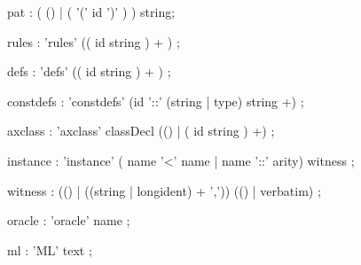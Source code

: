 \begin{rail}
pat : ( () | ( '(' id ')' ) ) string;

rules : 'rules' (( id string ) + )
      ;

defs : 'defs' (( id string ) + )
     ;

constdefs : 'constdefs' (id '::' (string | type) string +)
          ;

axclass : 'axclass' classDecl (() | ( id string ) +)
        ;

instance : 'instance' ( name '<' name | name '::' arity) witness
         ;

witness : (() | ((string | longident) + ',')) (() | verbatim)
        ;

oracle : 'oracle' name
       ;

ml : 'ML' text
   ;

\end{rail}

